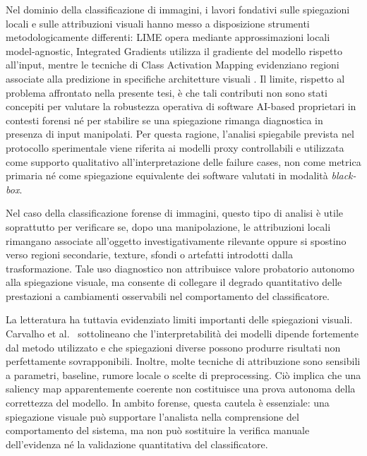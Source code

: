 Nel dominio della classificazione di immagini, i lavori fondativi sulle spiegazioni locali e sulle attribuzioni visuali hanno messo a disposizione strumenti metodologicamente differenti: LIME opera mediante approssimazioni locali model-agnostic, Integrated Gradients utilizza il gradiente del modello rispetto all'input, mentre le tecniche di Class Activation Mapping evidenziano regioni associate alla predizione in specifiche architetture visuali \cite{Ribeiro2016,Sundararajan2017,Zhou2016}. Il limite, rispetto al problema affrontato nella presente tesi, è che tali contributi non sono stati concepiti per valutare la robustezza operativa di software AI-based proprietari in contesti forensi né per stabilire se una spiegazione rimanga diagnostica in presenza di input manipolati. Per questa ragione, l'analisi spiegabile prevista nel protocollo sperimentale viene riferita ai modelli proxy controllabili e utilizzata come supporto qualitativo all'interpretazione delle failure cases, non come metrica primaria né come spiegazione equivalente dei software valutati in modalità \textit{black-box}.

Nel caso della classificazione forense di immagini, questo tipo di analisi è utile soprattutto per verificare se, dopo una manipolazione, le attribuzioni locali rimangano associate all'oggetto investigativamente rilevante oppure si spostino verso regioni secondarie, texture, sfondi o artefatti introdotti dalla trasformazione. Tale uso diagnostico non attribuisce valore probatorio autonomo alla spiegazione visuale, ma consente di collegare il degrado quantitativo delle prestazioni a cambiamenti osservabili nel comportamento del classificatore.

La letteratura ha tuttavia evidenziato limiti importanti delle spiegazioni visuali. Carvalho et al.~\cite{Carvalho2019} sottolineano che l'interpretabilità dei modelli dipende fortemente dal metodo utilizzato e che spiegazioni diverse possono produrre risultati non perfettamente sovrapponibili. Inoltre, molte tecniche di attribuzione sono sensibili a parametri, baseline, rumore locale o scelte di preprocessing. Ciò implica che una saliency map apparentemente coerente non costituisce una prova autonoma della correttezza del modello. In ambito forense, questa cautela è essenziale: una spiegazione visuale può supportare l'analista nella comprensione del comportamento del sistema, ma non può sostituire la verifica manuale dell'evidenza né la validazione quantitativa del classificatore.


